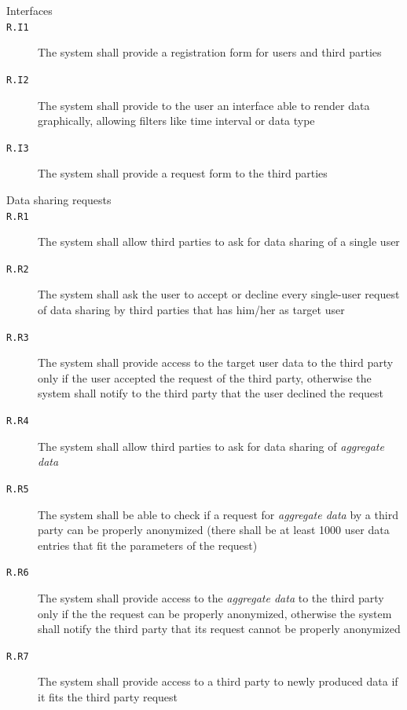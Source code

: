 \begin{description}
      \item[Interfaces]
      \item[\texttt{R.I1}] The system shall provide a registration form for users and third parties
      \item[\texttt{R.I2}] The system shall provide to the user an interface able to render data graphically, allowing filters like time interval or data type
      \item[\texttt{R.I3}] The system shall provide a request form to the third parties

      \item[Data sharing requests]
      \item[\texttt{R.R1}] The system shall allow third parties to ask for data sharing of a single user
      \item[\texttt{R.R2}] The system shall ask the user to accept or decline every single-user request of data sharing by third parties that has him/her as target user
      \item[\texttt{R.R3}] The system shall provide access to the target user data to the third party only if the user accepted the request of the third party, otherwise the system shall notify to the third party that the user declined the request
      \item[\texttt{R.R4}] The system shall allow third parties to ask for data sharing of \textit{aggregate data}
      \item[\texttt{R.R5}] The system shall be able to check if a request for \textit{aggregate data} by a third party can be properly anonymized (there shall be at least 1000 user data entries that fit the parameters of the request)
      \item[\texttt{R.R6}] The system shall provide access to the \textit{aggregate data} to the third party only if the the request can be properly anonymized, otherwise the system shall notify the third party that its request cannot be properly anonymized
      \item[\texttt{R.R7}] The system shall provide access to a third party to newly produced data if it fits the third party request


\end{description}
